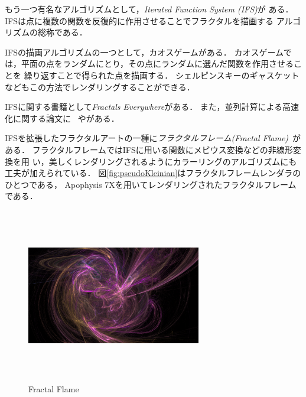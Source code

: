 もう一つ有名なアルゴリズムとして，\textit{Iterated Function System (IFS)}が
ある．IFSは点に複数の関数を反復的に作用させることでフラクタルを描画する
アルゴリズムの総称である．

IFSの描画アルゴリズムの一つとして，カオスゲームがある．
カオスゲームでは，平面の点をランダムにとり，その点にランダムに選んだ関数を作用させることを
繰り返すことで得られた点を描画する．
シェルピンスキーのギャスケットなどもこの方法でレンダリングすることができる．

IFSに関する書籍として\textit{Fractals
Everywhere}\cite{BarnsleyMathematics201207}がある．
また，並列計算による高速化に関する論文に
~\cite{2010_fractal_flames}や\cite{Green:2005:GIF:1187112.1187128}がある．

IFSを拡張したフラクタルアートの一種に\emph{フラクタルフレーム}\textit{(Fractal
Flame)}~\cite{draves2003fractal}がある．
フラクタルフレームではIFSに用いる関数にメビウス変換などの非線形変換を用
い，美しくレンダリングされるようにカラーリングのアルゴリズムにも工夫が加えられている．
図\ref{fig:pseudoKleinian}はフラクタルフレームレンダラのひとつである，
Apophysis 7Xを用いてレンダリングされたフラクタルフレームである．

\begin{figure}[htbp]
  \begin{center}
   \includegraphics[width=3in, height=3in, keepaspectratio]{../img/fractal/fractalFlame.pdf}
   \caption{Fractal Flame}
   \label{fig:fractalFlame}
  \end{center}
\end{figure}

\clearpage
